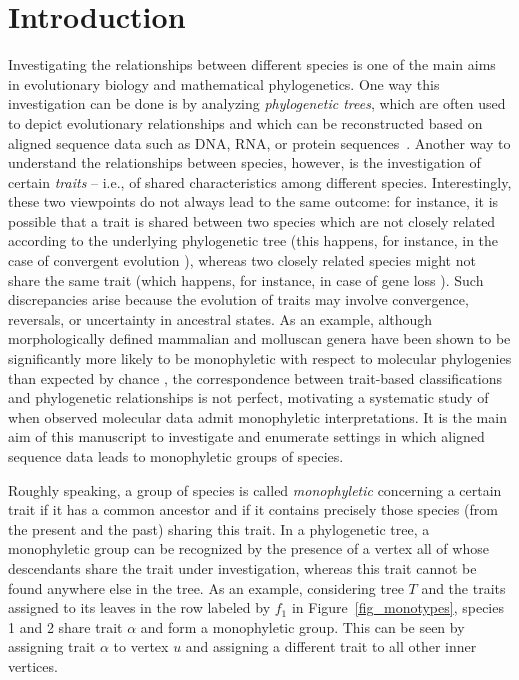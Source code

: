 \documentclass{amsart}
\theoremstyle{definition}
\begin{document}
\section{Introduction}
Investigating the relationships between different species is one of the main aims in evolutionary biology and mathematical phylogenetics. One way this investigation can be done is by analyzing \emph{phylogenetic trees}, which are often used to depict evolutionary relationships and which can be reconstructed based on aligned sequence data such as DNA, RNA, or protein sequences~\cite{felsenstein2003inferring,Semple2003}. Another way to understand the relationships between species, however, is the investigation of certain \emph{traits} -- i.e., of shared characteristics among different species. Interestingly, these two viewpoints do not always lead to the same outcome: for instance, it is possible that a trait is shared between two species which are not closely related according to the underlying phylogenetic tree (this happens, for instance, in the case of convergent evolution \cite{speed}), whereas two closely related species might not share the same trait (which happens, for instance, in case of gene loss \cite{Losos2011}). Such discrepancies arise because the evolution of traits may involve convergence, reversals, or uncertainty in ancestral states. As an example, although morphologically defined mammalian and molluscan genera have been shown to be significantly more likely to be monophyletic with respect to molecular phylogenies than expected by chance \cite{Jablonski2009}, the correspondence between trait-based classifications and phylogenetic relationships is not perfect, motivating a systematic study of when observed molecular data admit monophyletic interpretations. It is the main aim of this manuscript to investigate and enumerate settings in which aligned sequence data leads to monophyletic groups of species.

Roughly speaking, a group of species is called \emph{monophyletic} concerning a certain trait if it has a common ancestor and if it contains precisely those species (from the present and the past) sharing this trait. In a phylogenetic tree, a monophyletic group can be recognized by the presence of a vertex all of whose descendants share the trait under investigation, whereas this trait cannot be found anywhere else in the tree. As an example, considering tree $T$ and the traits assigned to its leaves in the row labeled by $f_1$ in Figure~\ref{fig_monotypes}, species 1 and 2 share trait $\alpha$ and form a monophyletic group. This can be seen by assigning trait $\alpha$ to vertex $u$ and assigning a different trait to all other inner vertices.
\end{document}
